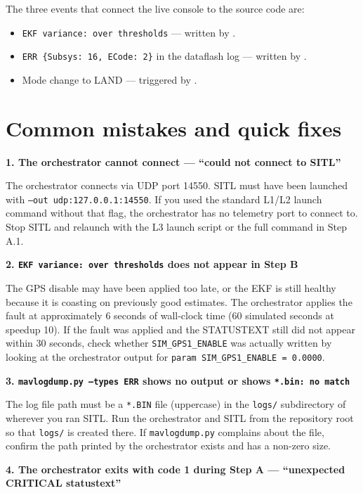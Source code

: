 \documentclass[a4paper,11pt,twoside]{article}
\begin{document}
The three events that connect the live console to the source code are:
\begin{itemize}
  \item \texttt{EKF variance: over thresholds} --- written by .
  \item \texttt{ERR \{Subsys: 16, ECode: 2\}} in the dataflash log --- written by .
  \item Mode change to LAND --- triggered by .
\end{itemize}

\section*{Common mistakes and quick fixes}

\textbf{1. The orchestrator cannot connect --- ``could not connect to SITL''}

The orchestrator connects via UDP port 14550. SITL must have been launched with \texttt{--out udp:127.0.0.1:14550}. If you used the standard L1/L2 launch command without that flag, the orchestrator has no telemetry port to connect to. Stop SITL and relaunch with the L3 launch script or the full command in Step A.1.

\textbf{2. \texttt{EKF variance: over thresholds} does not appear in Step B}

The GPS disable may have been applied too late, or the EKF is still healthy because it is coasting on previously good estimates. The orchestrator applies the fault at approximately 6 seconds of wall-clock time (60 simulated seconds at speedup 10). If the fault was applied and the STATUSTEXT still did not appear within 30 seconds, check whether \texttt{SIM\_GPS1\_ENABLE} was actually written by looking at the orchestrator output for \texttt{param SIM\_GPS1\_ENABLE = 0.0000}.

\textbf{3. \texttt{mavlogdump.py --types ERR} shows no output or shows \texttt{*.bin: no match}}

The log file path must be a \texttt{*.BIN} file (uppercase) in the \texttt{logs/} subdirectory of wherever you ran SITL. Run the orchestrator and SITL from the repository root so that \texttt{logs/} is created there. If \texttt{mavlogdump.py} complains about the file, confirm the path printed by the orchestrator exists and has a non-zero size.

\textbf{4. The orchestrator exits with code 1 during Step A --- ``unexpected CRITICAL statustext''}
\end{document}
